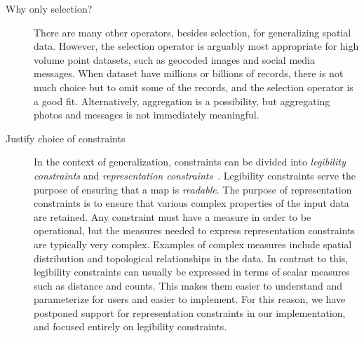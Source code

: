 \documentclass[11pt, oneside]{article}   	%
\begin{document}
\begin{description}
\item[Why only selection?] 


There are many other operators, besides selection, for generalizing spatial data. However, the selection operator is arguably most appropriate for high volume point datasets, such as geocoded images and social media messages. When dataset have millions or billions of records, there is not much choice but to omit some of the records, and the selection operator is a good fit. Alternatively, aggregation is a possibility, but aggregating photos and messages is not immediately meaningful.


\item[Justify choice of constraints] 
In the context of generalization, constraints can be divided into \emph{legibility constraints} and \emph{representation constraints}~\cite{harrie2007modelling}. Legibility constraints serve the purpose of ensuring that a map is \emph{readable}. The purpose of representation constraints is to ensure that various complex properties of the input data are retained. Any constraint must have a measure in order to be operational, but the measures needed to express representation constraints are typically very complex. Examples of complex measures include spatial distribution and topological relationships in the data. In contrast to this, legibility constraints can usually be expressed in terms of scalar measures such as distance and counts. This makes them easier to understand and parameterize for users and easier to implement. For this reason, we have postponed support for representation constraints in our implementation, and focused entirely on legibility constraints.


\end{description}
\end{document}
